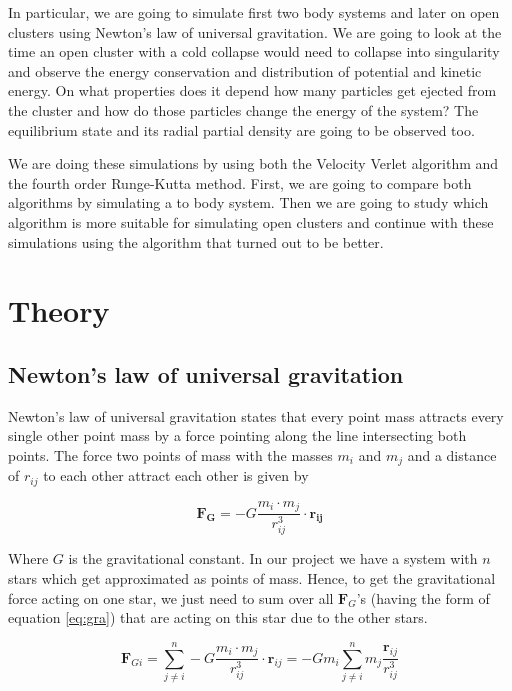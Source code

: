 \documentclass[10pt,a4paper]{article}
\begin{document}
In particular, we are going to simulate first two body systems and later on open clusters using Newton's law of universal gravitation. We are going to look at the time an open cluster with a cold collapse would need to collapse into singularity and observe the energy conservation and distribution of potential and kinetic energy. On what properties does it depend how many particles get ejected from the cluster and how do those particles change the energy of the system? The equilibrium state and its radial partial density are going to be observed too.

We are doing these simulations by using both the Velocity Verlet algorithm and the fourth order Runge-Kutta method. First, we are going to compare both algorithms by simulating a to body system. Then we are going to study which algorithm is more suitable for simulating open clusters and continue with these simulations using the algorithm that turned out to be better.


\section{Theory}

\subsection{Newton's law of universal gravitation}

Newton's law of universal gravitation states that every point mass attracts every single other point mass by a force pointing along the line intersecting both points. The force two points of mass with the masses $m_i$ and $m_j$ and a distance of $r_{ij}$ to each other attract each other is given by

\begin{equation}	
\label{eq:gra}
\mathbf{F_G} = - G \frac{m_i \cdot m_j}{r_{ij}^3} \cdot \mathbf{r_{ij}}
\end{equation}

Where $G$ is the gravitational constant. In our project we have a system with $n$ stars which get approximated as points of mass. Hence, to get the gravitational force acting on one star, we just need to sum over all $\mathbf{F}_G$'s (having the form of equation \eqref{eq:gra}) that are acting on this star due to the other stars.

\begin{equation}	
\label{eq:gra2}
\mathbf{F}_{Gi} = \sum_{j \neq i}^{n} - G \frac{m_i \cdot m_j}{r_{ij}^3} \cdot \mathbf{r}_{ij} = - G m_i \sum_{j \neq i}^{n} m_j \frac{\mathbf{r}_{ij}}{r_{ij}^3}
\end{equation}
\end{document}
